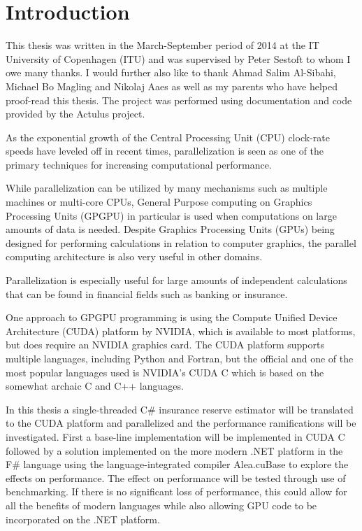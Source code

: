 \section{Introduction}
This thesis was written in the March-September period of 2014 at the IT University of Copenhagen (ITU) and was supervised by Peter Sestoft to whom I owe many thanks. 
I would further also like to thank Ahmad Salim Al-Sibahi, Michael Bo Magling and Nikolaj Aaes as well as my parents who have helped proof-read this thesis.
The project was performed using documentation and code provided by the Actulus project\cite{actulus}.

As the exponential growth of the Central Processing Unit (CPU) clock-rate speeds have leveled off in recent times\cite{ross2008cpu}, parallelization is seen as one of the primary techniques for increasing computational performance. 

While parallelization can be utilized by many mechanisms such as multiple machines or multi-core CPUs, General Purpose computing on Graphics Processing Units (GPGPU) in particular is used when computations on large amounts of data is needed. 
Despite Graphics Processing Units (GPUs) being designed for performing calculations in relation to computer graphics, the parallel computing architecture is also very useful in other domains.

Parallelization is especially useful for large amounts of independent calculations that can be found in financial fields such as banking or insurance.

One approach to GPGPU programming is using the Compute Unified Device Architecture (CUDA) platform by NVIDIA, which is available to most platforms, but does require an NVIDIA graphics card.
The CUDA platform supports multiple languages, including Python and Fortran, but the official and one of the most popular languages used is NVIDIA's CUDA C which is based on the somewhat archaic C and C++ languages.

In this thesis a single-threaded C\# insurance reserve estimator will be translated to the CUDA platform and parallelized and the performance ramifications will be investigated.
First a base-line implementation will be implemented in CUDA C followed by a solution implemented on the more modern .NET platform in the F\# language using the language-integrated compiler Alea.cuBase to explore the effects on performance.
The effect on performance will be tested through use of benchmarking.
If there is no significant loss of performance, this could allow for all the benefits of modern languages while also allowing GPU code to be incorporated on the .NET platform.

